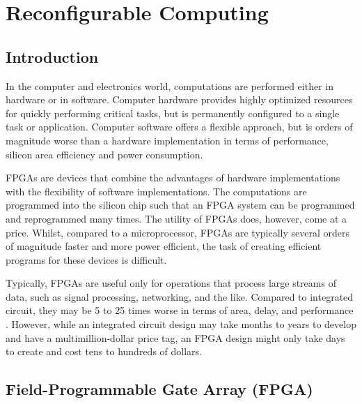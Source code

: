 \chapter{Reconfigurable Computing}
\label{ch:reconfigurableComputing}

\section{Introduction}
In the computer and electronics world, computations are performed either in 
hardware or in software. Computer hardware provides highly optimized resources
for quickly performing critical tasks, but is permanently configured to a 
single task or application. Computer software offers a flexible approach, but is
orders of magnitude worse than a hardware implementation in terms of 
performance, silicon area efficiency and power consumption.

\Glspl{FPGA} are devices that combine the advantages of hardware implementations
with the flexibility of software implementations. The computations are 
programmed into the silicon chip such that an \gls{FPGA} system can be 
programmed and reprogrammed many times. The utility of \glspl{FPGA} does, 
however, come at a price. Whilst, compared to a microprocessor, \glspl{FPGA}
are typically several orders of magnitude faster and more power efficient, the 
task of creating efficient programs for these devices is difficult.

Typically, \glspl{FPGA} are useful only for operations that process large 
streams of data, such as signal processing, networking, and the like. Compared
to integrated circuit, they may be 5 to 25 times worse in terms of area, delay,
and performance \cite{HAUCK08}. However, while an integrated circuit design may 
take months to years to develop and have a multimillion-dollar price tag, an 
FPGA design might only take days to create and cost tens to hundreds of dollars.

\section{Field-Programmable Gate Array (FPGA)}
